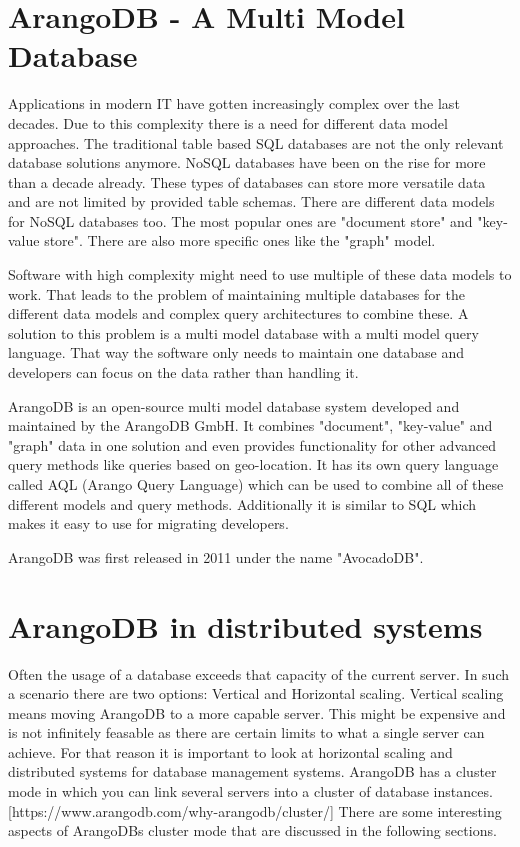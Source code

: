 
\section{ArangoDB - A Multi Model Database}
Applications in modern IT have gotten increasingly complex over the last decades. Due to this complexity there is a need for different data model approaches. The traditional table based SQL databases are not the only relevant database solutions anymore. NoSQL databases have been on the rise for more than a decade already. These types of databases can store more versatile data and are not limited by provided table schemas. There are different data models for NoSQL databases too. The most popular ones are "document store" and "key-value store". There are also more specific ones like the "graph" model.

Software with high complexity might need to use multiple of these data models to work. That leads to the problem of maintaining multiple databases for the different data models and complex query architectures to combine these. A solution to this problem is a multi model database with a multi model query language. That way the software only needs to maintain one database and developers can focus on the data rather than handling it.

ArangoDB is an open-source multi model database system developed and maintained by the ArangoDB GmbH. It combines "document", "key-value" and "graph" data in one solution and even provides functionality for other advanced query methods like queries based on geo-location. It has its own query language called AQL (Arango Query Language) which can be used to combine all of these different models and query methods. Additionally it is similar to SQL which makes it easy to use for migrating developers.

ArangoDB was first released in 2011 under the name "AvocadoDB". 

\cite{ArangoHomepage}

\section{ArangoDB in distributed systems}
Often the usage of a database exceeds that capacity of the current server. In such a scenario there are two options: Vertical and Horizontal scaling. Vertical scaling means moving ArangoDB to a more capable server. This might be expensive and is not infinitely feasable as there are certain limits to what a single server can achieve. For that reason it is important to look at horizontal scaling and distributed systems for database management systems. ArangoDB has a cluster mode in which you can link several servers into a cluster of database instances. [https://www.arangodb.com/why-arangodb/cluster/] There are some interesting aspects of ArangoDBs cluster mode that are discussed in the following sections.

